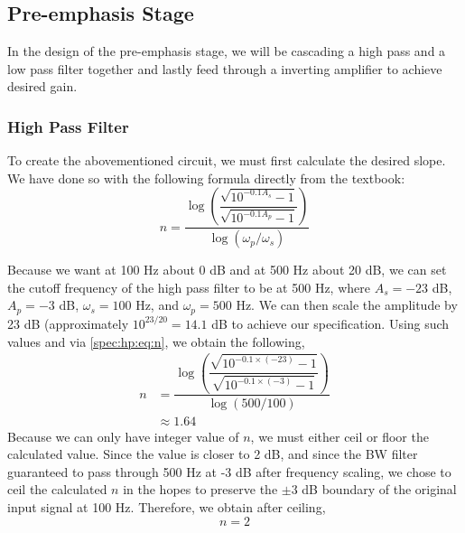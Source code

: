 \documentclass[a4paper]{IEEEtran}
\begin{document}
		\subsection{Pre-emphasis Stage}
			In the design of the pre-emphasis stage, we will be cascading a high pass and a low pass filter together and lastly feed through a inverting amplifier to achieve desired gain.
			
			\subsubsection{High Pass Filter}
				To create the abovementioned circuit, we must first calculate the desired slope. We have done so with the following formula directly from the textbook:
				\begin{equation}
					\label{spec:hp:eq:n}
						n=\dfrac{
							\log{\left(
								\dfrac{
									\sqrt{10^{-0.1A_s}-1}
								}{
									\sqrt{10^{-0.1A_p}-1}
								}
							\right)}}{
							\log{
								(\omega_p / \omega_s)
							}
						}
				\end{equation}
				
				Because we want at 100 Hz about 0 dB and at 500 Hz about 20 dB, we can set the cutoff frequency of the high pass filter to be at 500 Hz, where $A_s = -23$ dB, $A_p = -3$ dB, $\omega_s=100$ Hz, and $\omega_p=500$ Hz. We can then scale the amplitude by 23 dB (approximately $10^{23/20} = 14.1 $ dB to achieve our specification. Using such values and via \eqref{spec:hp:eq:n}, we obtain the following,
				\begin{align*}
					n&=\dfrac{
						\log{\left(
							\dfrac{
								\sqrt{10^{-0.1\times (-23)}-1}
							}{
								\sqrt{10^{-0.1\times (-3)}-1}
							}
						\right)}}{
						\log{
							(500 / 100)
						}
					} \\
					&\approx 1.64
				\end{align*}
				Because we can only have integer value of $n$, we must either ceil or floor the calculated value. Since the value is closer to 2 dB, and since the BW filter guaranteed to pass through 500 Hz at -3 dB after frequency scaling, we chose to ceil the calculated $n$ in the hopes to preserve the $\pm 3$ dB boundary of the original input signal at 100 Hz. Therefore, we obtain after ceiling,
				\begin{equation}
					\label{spec:hp:n}
					n=2
				\end{equation}
				
\end{document}

